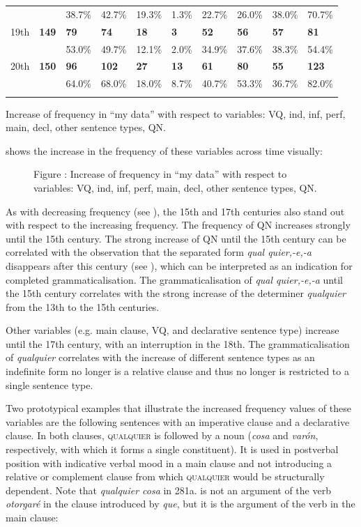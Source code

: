 \begin{table}
\begin{tabularx}{\textwidth}{XXXXXXXXXX}
& ~ & 38.7\% & 42.7\% & 19.3\% & 1.3\% & 22.7\% & 26.0\% & 38.0\% & 70.7\%\\
 19th & \textbf{149} & \textbf{79} & \textbf{74} & \textbf{18} & \textbf{3} & \textbf{52} & \textbf{56} & \textbf{57} & \textbf{81}\\
& ~ & 53.0\% & 49.7\% & 12.1\% & 2.0\% & 34.9\% & 37.6\% & 38.3\% & 54.4\%\\
 20th & \textbf{150} & \textbf{96} & \textbf{102} & \textbf{27} & \textbf{13} & \textbf{61} & \textbf{80} & \textbf{55} & \textbf{123}\\
& ~ & 64.0\% & 68.0\% & 18.0\% & 8.7\% & 40.7\% & 53.3\% & 36.7\% & 82.0\%\\
\lspbottomrule
\end{tabularx}
\caption{\label{tab:} ~}Increase of frequency in “my data” with respect to variables: VQ, ind, inf, perf, main, decl, other sentence types, QN.
\end{table}

 shows the increase in the frequency of these variables across time visually:


\begin{figure}
Figure : Increase of frequency in “my data” with respect to variables: VQ, ind, inf, perf, main, decl, other sentence types, QN.
\end{figure}

As with decreasing frequency (see ), the 15th and 17th centuries also stand out with respect to the increasing frequency. The frequency of QN increases strongly until the 15th century. The strong increase of QN until the 15th century can be correlated with the observation that the separated form \textit{qual quier,-e,-a} disappears after this century (see ), which can be interpreted as an indication for completed grammaticalisation. The grammaticalisation of \textit{qual quier,-e,-a} until the 15th century correlates with the strong increase of the determiner \textit{qualquier} from the 13th to the 15th centuries.

  Other variables (e.g. main clause, VQ, and declarative sentence type) increase until the 17th century, with an interruption in the 18th. The grammaticalisation of \textit{qualquier} correlates with the increase of different sentence types as an indefinite form no longer is a relative clause and thus no longer is restricted to a single sentence type.

  Two prototypical examples that illustrate the increased frequency values of these variables are the following sentences with an imperative clause and a declarative clause. In both clauses, \textsc{qualquier} is followed by a noun (\textit{cosa} and \textit{varón}, respectively, with which it forms a single constituent). It is used in postverbal position with indicative verbal mood in a main clause and not introducing a relative or complement clause from which \textsc{qualquier} would be structurally dependent. Note that \textit{qualquier cosa} in 281a. is not an argument of the verb \textit{otorgaré} in the clause introduced by \textit{que}, but it is the argument of the verb in the main clause:

